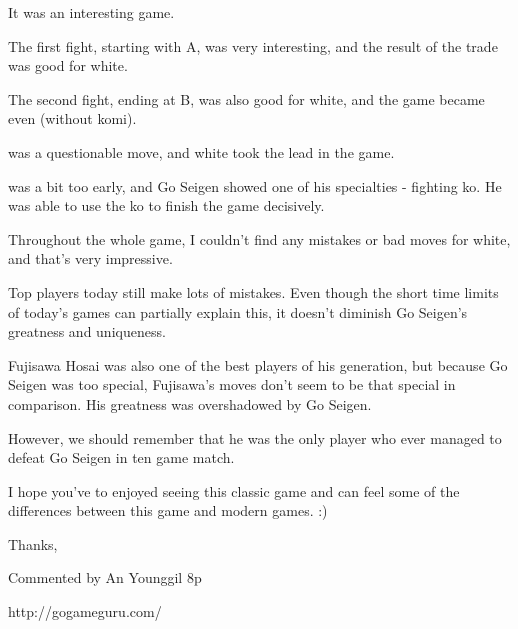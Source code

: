 \documentclass[letterpaper,12pt]{memoir}
\begin{document}
It was an interesting game.

The first fight, starting with A, was very interesting, and the result of the trade was good for white.

The second fight, ending at B, was also good for white, and the game became even (without komi).

{} was a questionable move, and white took the lead in the game.

{} was a bit too early, and Go Seigen showed one of his specialties - fighting ko. He was able to use the ko to finish the game decisively.

Throughout the whole game, I couldn't find any mistakes or bad moves for white, and that's very impressive.

Top players today still make lots of mistakes. Even though the short time limits of today's games can partially explain this, it doesn't diminish Go Seigen's greatness and uniqueness.

Fujisawa Hosai was also one of the best players of his generation, but because Go Seigen was too special, Fujisawa's moves don't seem to be that special in comparison. His greatness was overshadowed by Go Seigen.

However, we should remember that he was the only player who ever managed to defeat Go Seigen in ten game match.

I hope you've to enjoyed seeing this classic game and can feel some of the differences between this game and modern games. :)

Thanks, 

Commented by An Younggil 8p

http://gogameguru.com/


\vfill

\cleartorecto
\end{document}
